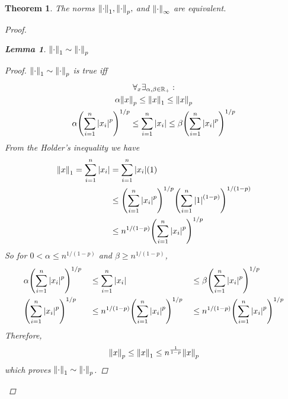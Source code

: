 \documentclass[]{article}
\newcommand{\R}{\mathbb{R}}
\newtheorem{theorem}{Theorem}
\newtheorem{lemma}{Lemma}
\begin{document}
\newpage
\begin{theorem}
    The norms $\norm{\cdot}_1, \norm{\cdot}_p,$ and $\norm{\cdot}_\infty$ are equivalent.
    \begin{proof}
        \begin{lemma}\label{lem:1-1toP}
            $\norm{\cdot}_1 \sim \norm{\cdot}_p$
            \begin{proof}
                $\norm{\cdot}_1 \sim \norm{\cdot}_p$ is true iff
                \begin{multline*}
                    \forall_{x} \exists_{\alpha,\beta \in \R_+} :\\
                    \alpha \norm{x}_p 
                        \leq \norm{x}_1 
                        \leq \norm{x}_p\\
                    \alpha \qty(\sum_{i=1}^n \abs{x_i}^p)^{1/p}
                        \leq \sum_{i=1}^n \abs{x_i}
                        \leq \beta \qty(\sum_{i=1}^n \abs{x_i}^p)^{1/p}\\
                \end{multline*}
                From the Holder's inequality we have 
                \begin{align*}
                    \norm{x}_1 = \sum_{i=1}^n \abs{x_i}
                        &= \sum_{i=1}^n \abs{x_i} (1)\\
                        &\leq \qty(\sum_{i=1}^n \abs{x_i}^p)^{1/p}
                            \qty(\sum_{i=1}^n \abs{1}^{(1-p)})^{1/(1-p)}\\
                        &\leq n^{1/(1-p)} \qty(\sum_{i=1}^n \abs{x_i}^p)^{1/p} 
                \end{align*}
                So for $0 < \alpha \leq n^{1/(1-p)}$ and $\beta \geq n^{1/(1-p)}$,
                \begin{align*}
                    &\alpha \qty(\sum_{i=1}^n \abs{x_i}^p)^{1/p}
                        &&\leq \sum_{i=1}^n \abs{x_i}
                        &&\leq \beta \qty(\sum_{i=1}^n \abs{x_i}^p)^{1/p}\\
                    &\qty(\sum_{i=1}^n \abs{x_i}^p)^{1/p}
                        &&\leq n^{1/(1-p)} \qty(\sum_{i=1}^n \abs{x_i}^p)^{1/p} 
                        &&\leq n^{1/(1-p)} \qty(\sum_{i=1}^n \abs{x_i}^p)^{1/p}
                \end{align*}
                Therefore,
                \[\norm{x}_p \leq \norm{x}_1 \leq n^{\frac{1}{1-p}} \norm{x}_p\]
                which proves $\norm{\cdot}_1 \sim \norm{\cdot}_p$.

\end{proof}
\end{lemma}
\end{proof}
\end{theorem}
\end{document}
